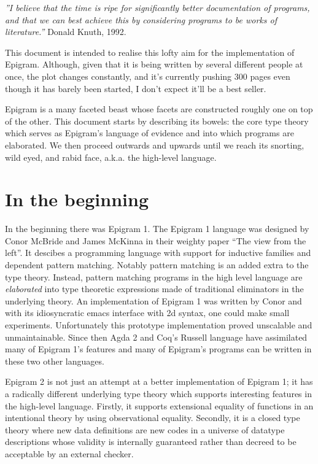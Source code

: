 
\emph{''I believe that the time is ripe for significantly better
  documentation of programs, and that we can best achieve this by
  considering programs to be works of literature.''} Donald Knuth,
1992.

This document is intended to realise this lofty aim for the
implementation of Epigram. Although, given that it is being written by
several different people at once, the plot changes constantly, and
it's currently pushing 300 pages even though it has barely been started,
I don't expect it'll be a best seller.

Epigram is a many faceted beast whose facets are constructed roughly
one on top of the other. This document starts by describing its
bowels: the core type theory which serves as Epigram's language of
evidence and into which programs are elaborated. We then proceed
outwards and upwards until we reach its snorting, wild eyed, and rabid
face, a.k.a. the high-level language.

\section{In the beginning}
In the beginning there was Epigram 1. The Epigram 1 language was
designed by Conor McBride and James McKinna in their weighty paper
``The view from the left''\cite{conor.james:viewfromleft}. It descibes
a programming language with support for inductive families and
dependent pattern matching. Notably pattern matching is an added extra
to the type theory.  Instead, pattern matching programs in the high
level language are \emph{elaborated} into type theoretic expressions
made of traditional eliminators in the underlying theory. An
implementation of Epigram 1 was written by Conor and with its
idiosyncratic emacs interface with 2d syntax, one could make small
experiments. Unfortunately this prototype implementation proved
unscalable and unmaintainable. Since then Agda 2 and Coq's Russell
language have assimilated many of Epigram 1's features and many of
Epigram's programs can be written in these two other languages.

Epigram 2 is not just an attempt at a better implementation of Epigram
1; it has a radically different underlying type theory which supports
interesting features in the high-level language. Firstly, it supports
extensional equality of functions in an intentional theory by using
observational equality. Secondly, it is a closed type theory where new
data definitions are new codes in a universe of datatype descriptions
whose validity is internally guaranteed rather than decreed to be
acceptable by an external checker.

